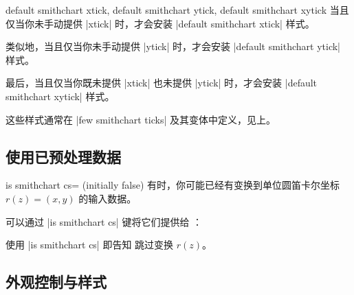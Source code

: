 \begin{pgfplotskeylist}{%
    default smithchart xtick,
    default smithchart ytick,
    default smithchart xytick%
}
    当且仅当你未手动提供 |xtick| 时，才会安装 |default smithchart xtick| 样式。

    类似地，当且仅当你未手动提供 |ytick| 时，才会安装 |default smithchart ytick|
    样式。

    最后，当且仅当你既未提供 |xtick| 也未提供 |ytick| 时，才会安装
    |default smithchart xytick| 样式。

    这些样式通常在 |few smithchart ticks| 及其变体中定义，见上。
\end{pgfplotskeylist}


\subsection{使用已预处理数据}

\begin{pgfplotskey}{is smithchart cs= (initially false)}
    有时，你可能已经有变换到单位圆笛卡尔坐标 $r(z) = (x,y)$ 的输入数据。

    可以通过 |is smithchart cs| 键将它们提供给 \PGFPlots{}：
\begin{codeexample}[]
\end{codeexample}
    使用 |is smithchart cs| 即告知 \PGFPlots{} 跳过变换 $r(z)$。
\end{pgfplotskey}


\subsection{外观控制与样式}

